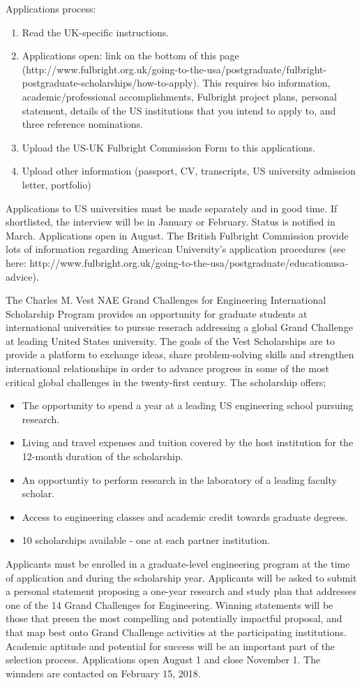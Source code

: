 \documentclass[idxtotoc,hyperref,openany]{labbook} %
\begin{document}
Applications process:
\begin{enumerate}
	\item Read the UK-specific instructions.
	\item Applications open: link on the bottom of this page (http://www.fulbright.org.uk/going-to-the-usa/postgraduate/fulbright-postgraduate-scholarships/how-to-apply). This requires bio information, academic/professional accomplishments, Fulbright project plans, personal statement, details of the US institutions that you intend to apply to, and three reference nominations.
	\item Upload the US-UK Fulbright Commission Form to this applications.
	\item Upload other information (passport, CV, transcripts, US university admission letter, portfolio)
\end{enumerate}
Applications to US universities must be made separately and in good time. If shortlisted, the interview will be in January or February. Status is notified in March. Applications open in August. The British Fulbright Commission provide lots of information regarding American University's application procedures (see here: http://www.fulbright.org.uk/going-to-the-usa/postgraduate/educationusa-advice).
  
 
The Charles M. Vest NAE Grand Challenges for Engineering International Scholarship Program provides an opportunity for graduate students at international universities to pursue reserach addressing a global Grand Challenge at leading United States university. The goals of the Vest Scholarships are to provide a platform to exchange ideas, share problem-solving skills and strengthen international  relationships in order to advance progress in some of the most critical global challenges in the twenty-first century. The scholarship offers;
\begin{itemize}
	\item The opportunity to spend a year at a leading US engineering school pursuing research.
	\item Living and travel expenses and tuition covered by the host institution for the 12-month duration of the scholarship.
	\item An opportuntiy to perform research in the laboratory of a leading faculty scholar.
	\item Access to engineering classes and academic credit towards graduate degrees.
	\item 10 scholarships available - one at each partner institution.
\end{itemize}
Applicants must be enrolled in a graduate-level engineering program at the time of application and during the scholarship year. Applicants will be asked to submit a personal statement proposing a one-year research and study plan that addresses one of the 14 Grand Challenges for Engineering. Winning statements will be those that presen the most compelling and potentially impactful proposal, and that map best onto Grand Challenge activities at the participating institutions. Academic aptitude and potential for success will be an important part of the selection process. Applications open August 1 and close November 1. The winnders are contacted on February 15, 2018.
\end{document}
